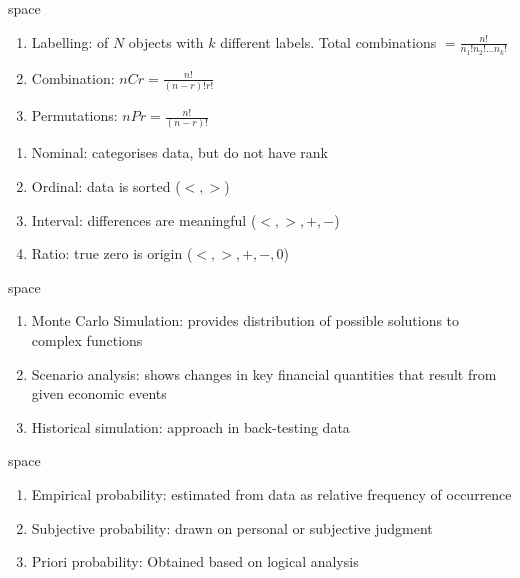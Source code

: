 \begin{definition} {\color{white}space}
\begin{enumerate}[label=\roman*.]
\setlength{\itemsep}{0pt}
\item Labelling: of $N$ objects with $k$ different labels. Total combinations $= \frac{n!}{n_1 ! n_2 ! \ldots n_k !}$
\item Combination: $nCr = \frac{n!}{(n-r)! r!}$
\item Permutations: $nPr = \frac{n!}{(n-r)!}$
\end{enumerate}
\end{definition}

\begin{definition}
\begin{enumerate}[label=\roman*.]
\setlength{\itemsep}{0pt}
\item Nominal: categorises data, but do not have rank
\item Ordinal: data is sorted ($<, >$)
\item Interval: differences are meaningful ($<, >, +, -$)
\item Ratio: true zero is origin ($<, >, +, -, 0$)
\end{enumerate}
\end{definition}

\begin{definition}
	{\color{white}space}
\begin{enumerate}[label=\roman*.]
\setlength{\itemsep}{0pt}
\item Monte Carlo Simulation: provides distribution of possible solutions to complex functions
\item Scenario analysis: shows changes in key financial quantities that result from given economic events
\item Historical simulation: approach in back-testing data
\end{enumerate}
\end{definition}

\begin{definition}
	{\color{white}space}
\begin{enumerate}[label=\roman*.]
\setlength{\itemsep}{0pt}
\item Empirical probability: estimated from data as relative frequency of occurrence
\item Subjective probability: drawn on personal or subjective judgment
\item Priori probability: Obtained based on logical analysis
\end{enumerate}
\end{definition}

